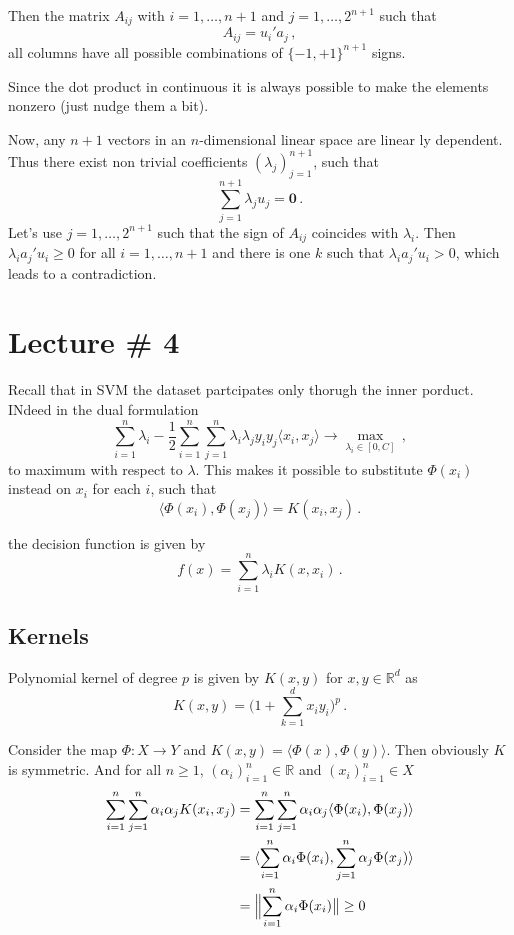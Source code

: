 \documentclass[a4paper]{article}
\newcommand{\Real}{\mathbb{R}}
\begin{document}
Then the matrix $A_{ij}$ with $i=1, \ldots, n+1$ and $j=1,\ldots,2^{n+1}$
such that 
\[ A_{ij} = u_i' a_j\,, \]
all columns have all possible combinations of $\{-1,+1\}^{n+1}$ signs.

Since the dot product in continuous it is always possible to make
the elements nonzero (just nudge them a bit).

Now, any $n+1$ vectors in an $n$-dimensional linear space are linear ly dependent.
Thus there exist non trivial coefficients $(\lambda_j)_{j=1}^{n+1}$, such that
\[ \sum_{j=1}^{n+1} \lambda_j u_j = \mathbf{0} \,. \]
Let's use $j=1,\ldots,2^{n+1}$ such that the sign of $A_{ij}$ coincides
with $\lambda_i$. Then $\lambda_i a_j'u_i \geq 0$ for all $i=1,\ldots,n+1$ and there
is one $k$ such that $\lambda_i a_j'u_i > 0$, which leads to a contradiction. 




\section{Lecture \# 4} %
\label{sec:lecture_#_4}

Recall that in SVM the dataset partcipates only thorugh the inner porduct.
INdeed in the dual formulation
\[ \sum_{i=1}^n \lambda_i -
   \frac{1}{2} \sum_{i=1}^n \sum_{j=1}^n \lambda_i \lambda_j y_i y_j \langle x_i, x_j \rangle
   \to \max_{\lambda_i\in [0,C] } \,, \]
to maximum with respect to $\lambda$. This makes it possible to substitute
$\Phi(x_i)$ instead on $x_i$ for each $i$, such that 
\[ \langle \Phi(x_i), \Phi(x_j) \rangle = K(x_i, x_j) \,.\]

the decision function is given by
\[ f(x) = \sum_{i=1}^n \lambda_i K(x, x_i) \,. \]

\subsection{Kernels} %
\label{sub:kernels}

Polynomial kernel of degree $p$ is given by $K(x,y)$ for $x,y\in \Real^d$ as
\[ K(x,y) = \bigl( 1 + \sum_{k=1}^d x_i y_i \bigr)^p\,. \]

Consider the map $\Phi:X\to Y$ and $K(x,y) = \langle\Phi(x),\Phi(y)\rangle$.
Then obviously $K$ is symmetric. And for all $n\geq 1$, $(\alpha_i)_{i=1}^n\in \Real$
and $(x_i)_{i=1}^n\in X$
\begin{align*}
	\sum_{i=1}^n \sum_{j=1}^n \alpha_i \alpha_j K(x_i,x_j)
		&= \sum_{i=1}^n \sum_{j=1}^n \alpha_i \alpha_j \langle \Phi(x_i),\Phi(x_j)\rangle \\
		&= \langle \sum_{i=1}^n \alpha_i \Phi(x_i), \sum_{j=1}^n \alpha_j \Phi(x_j)\rangle \\
		&= \Bigl\| \sum_{i=1}^n \alpha_i \Phi(x_i) \bigr\| \geq 0
\end{align*}
\end{document}
